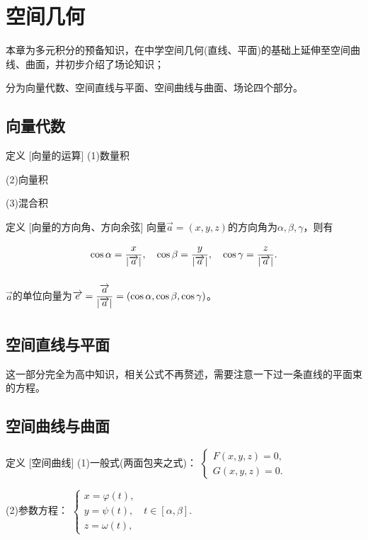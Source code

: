\documentclass[a4paper,12pt,oneside,fontset=none]{ctexbook}
\let\olddfrac\dfrac
\renewcommand{\dfrac}[2]{
    \olddfrac{#1\vrule width 0pt height 1.15em depth 0em}{#2\vrule width 0pt height 0em depth 0.6em}
}
\newcounter{definition}[chapter]
\newenvironment{definition}[1][]{\begin{defBox}{定义}{#1}}{\end{defBox}}
\numberwithin{equation}{chapter}
\begin{document}
\chapter{空间几何}
本章为多元积分的预备知识，在中学空间几何(直线、平面)的基础上延伸至空间曲线、曲面，并初步介绍了场论知识；

分为向量代数、空间直线与平面、空间曲线与曲面、场论四个部分。

\section{向量代数}
\begin{definition}
    [向量的运算]
    (1)数量积

    (2)向量积
    
    (3)混合积

\end{definition}
\begin{definition}
    [向量的方向角、方向余弦]
    向量$\overrightarrow{a} = (x,y,z)$的方向角为$\alpha,\beta,\gamma$，则有
    $$\cos\alpha = \dfrac{x}{|\overrightarrow{a}|},\quad \cos\beta = \dfrac{y}{|\overrightarrow{a}|},\quad \cos\gamma = \dfrac{z}{|\overrightarrow{a}|}.$$

    $\overrightarrow{a}$的单位向量为$\overrightarrow{e} = \dfrac{\overrightarrow{a}}{|\overrightarrow{a}|} = (\cos\alpha,\cos\beta,\cos\gamma)$。
\end{definition}

\section{空间直线与平面}
这一部分完全为高中知识，相关公式不再赘述，需要注意一下过一条直线的平面束的方程。

\section{空间曲线与曲面}
\begin{definition}
    [空间曲线]
    (1)一般式(两面包夹之式)：
    $\begin{cases}
        F(x,y,z) = 0,\\
        G(x,y,z) = 0.
    \end{cases}$
    
    (2)参数方程：
    $\begin{cases}
        x = \varphi (t),\\
        y = \psi (t),\quad t\in[\alpha,\beta].\\
        z = \omega (t),
    \end{cases}$
    
\end{definition}
\end{document}
